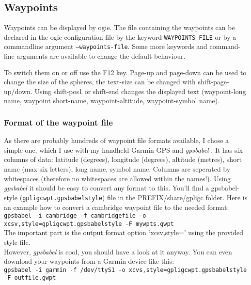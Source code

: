 

\subsection{Waypoints}
\label{wp}

Waypoints can be displayed by ogie.
The file containing the waypoints can be declared in the ogie-configuration file by the keyword \texttt{WAYPOINTS\_FILE} or by a commandline argument \texttt{--waypoints-file}. Some more keywords and command-line arguments are available to change the default behaviour.

To switch them on or off use the F12 key. Page-up and page-down can be used to change the size of the spheres, the text-size can be changed with shift-page-up/down. Using shift-pos1 or shift-end changes the displayed text (waypoint-long name, waypoint short-name, waypoint-altitude, waypoint-symbol name).

\subsubsection{Format of the waypoint file}
As there are probably hundreds of waypoint file formats available, I chose a simple one, which I use with my handheld Garmin GPS and \emph{gpsbabel} \cite{gpsbabel}.
It has six columns of data: latitude (degrees), longitude (degrees), altitude (metres), short name (max six letters), long name, symbol name.
Columns are seperated by whitespaces (therefore no whitespaces are allowed within the names!).
Using \emph{gpsbabel} it should be easy to convert any format to this.
You'll find a gpsbabel-style (\texttt{gpligcwpt.gpsbabelstyle}) file in the PREFIX/share/gpligc folder.
Here is an example how to convert a cambridge waypoint file to the needed format:\\

\texttt{gpsbabel -i cambridge -f cambridgefile  -o xcsv,style=gpligcwpt.gpsbabelstyle -F mywpts.gwpt}\\
The important part is the output format option `xcsv,style=' using the provided style file.\\
However, \emph{gpsbabel} is cool, you should have a look at it anyway.
You can even download your waypoints from a Garmin device like this:\\
\texttt{gpsbabel -i garmin -f /dev/ttyS1 -o xcvs,style=gpligcwpt.gpsbabelstyle -F outfile.gwpt}
